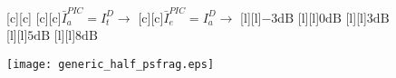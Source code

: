 \documentclass{article}
\begin{document}
\begin{figure}[htb]
  \begin{center}

        [c][c]{}
        [c][c]{$\bar{I}_{a}^{PIC}=I_{t}^D \rightarrow$}
        [c][c]{$\bar{I}_{e}^{PIC}=I_{a}^D \rightarrow$}
        [l][l]{$\mathrm{-3dB}$}
        [l][l]{$\mathrm{0dB}$}
	[l]{$\mathrm{3dB}$}
	[l]{$\mathrm{5dB}$}
        [l][l]{$\mathrm{8dB}$}       

    \texttt{[image: generic\_half\_psfrag.eps]}
    \end{center}
\end{figure}
\end{document}
